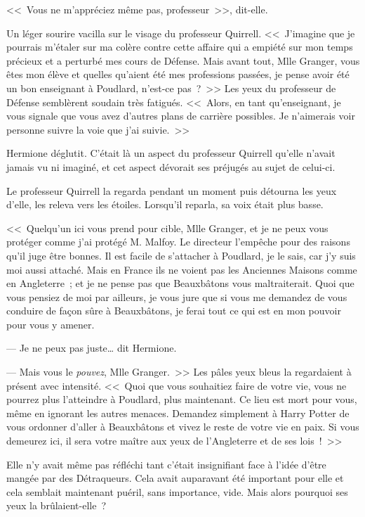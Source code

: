 <<~Vous ne m'appréciez même pas, professeur~>>, dit-elle.

Un léger sourire vacilla sur le visage du professeur Quirrell. <<~J'imagine que je pourrais m'étaler sur ma colère contre cette affaire qui a empiété sur mon temps précieux et a perturbé mes cours de Défense. Mais avant tout, Mlle Granger, vous êtes mon élève et quelles qu'aient été mes professions passées, je pense avoir été un bon enseignant à Poudlard, n'est-ce pas~?~>> Les yeux du professeur de Défense semblèrent soudain très fatigués. <<~Alors, en tant qu'enseignant, je vous signale que vous avez d'autres plans de carrière possibles. Je n'aimerais voir personne suivre la voie que j'ai suivie.~>>

Hermione déglutit. C'était là un aspect du professeur Quirrell qu'elle n'avait jamais vu ni imaginé, et cet aspect dévorait ses préjugés au sujet de celui-ci.

Le professeur Quirrell la regarda pendant un moment puis détourna les yeux d'elle, les releva vers les étoiles. Lorsqu'il reparla, sa voix était plus basse.

<<~Quelqu'un ici vous prend pour cible, Mlle Granger, et je ne peux vous protéger comme j'ai protégé M. Malfoy. Le directeur l'empêche pour des raisons qu'il juge être bonnes. Il est facile de s'attacher à Poudlard, je le sais, car j'y suis moi aussi attaché. Mais en France ils ne voient pas les Anciennes Maisons comme en Angleterre~; et je ne pense pas que Beauxbâtons vous maltraiterait. Quoi que vous pensiez de moi par ailleurs, je vous jure que si vous me demandez de vous conduire de façon sûre à Beauxbâtons, je ferai tout ce qui est en mon pouvoir pour vous y amener.

--- Je ne peux pas juste… dit Hermione.

--- Mais vous le \emph{pouvez}, Mlle Granger.~>> Les pâles yeux bleus la regardaient à présent avec intensité. <<~Quoi que vous souhaitiez faire de votre vie, vous ne pourrez plus l'atteindre à Poudlard, plus maintenant. Ce lieu est mort pour vous, même en ignorant les autres menaces. Demandez simplement à Harry Potter de vous ordonner d'aller à Beauxbâtons et vivez le reste de votre vie en paix. Si vous demeurez ici, il sera votre maître aux yeux de l'Angleterre et de ses lois~!~>>

Elle n'y avait même pas réfléchi tant c'était insignifiant face à l'idée d'être mangée par des Détraqueurs. Cela avait auparavant été important pour elle et cela semblait maintenant puéril, sans importance, vide. Mais alors pourquoi ses yeux la brûlaient-elle~?

